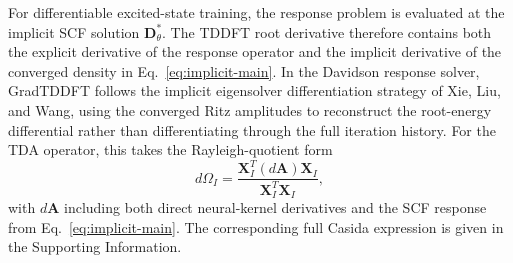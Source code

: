 For differentiable excited-state training, the response problem is
evaluated at the implicit SCF solution $\mathbf{D}_\theta^\ast$. The
TDDFT root derivative therefore contains both the explicit derivative
of the response operator and the implicit derivative of the converged
density in Eq.~\eqref{eq:implicit-main}. In the Davidson response
solver, GradTDDFT follows the implicit eigensolver differentiation
strategy of Xie, Liu, and Wang,\cite{Xie2020DominantEigensolverAD}
using the converged Ritz amplitudes to reconstruct the root-energy
differential rather than differentiating through the full iteration
history. For the TDA operator, this takes the Rayleigh-quotient form
\begin{equation}
  d\Omega_I
  =
  \frac{
    \mathbf{X}_I^{T}
    (d\mathbf{A})
    \mathbf{X}_I
  }{
    \mathbf{X}_I^{T}\mathbf{X}_I
  },
  \label{eq:tda-root-differential-main}
\end{equation}
with $d\mathbf{A}$ including both direct neural-kernel derivatives and
the SCF response from Eq.~\eqref{eq:implicit-main}. The corresponding
full Casida expression is given in the Supporting Information.
